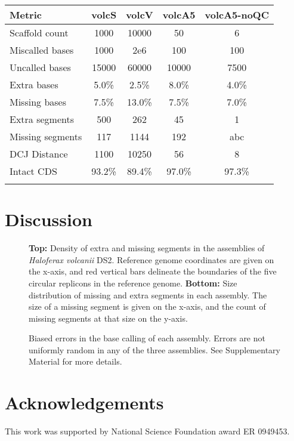 \documentclass{bioinfo}
\begin{document}
\begin{table}[!t]
{\begin{tabular}{l|cccc}\toprule
Metric & volcS & volcV & volcA5 & volcA5-noQC\\\midrule
Scaffold count & 1000 & 10000 & 50  & 6 \\
Miscalled bases & 1000 & 2e6 & 100 & 100 \\
Uncalled bases & 15000 & 60000 & 10000 & 7500 \\
Extra bases & 5.0\% & 2.5\% & 8.0\% & 4.0\% \\
Missing bases & 7.5\% & 13.0\% & 7.5\% & 7.0\% \\
Extra segments & 500 & 262 & 45 & 1 \\
Missing segments & 117 & 1144 & 192 & abc \\
DCJ Distance & 1100 & 10250 & 56 & 8 \\
Intact CDS & 93.2\% & 89.4\% & 97.0\% & 97.3\% \\
\botrule \\
\end{tabular}}{}
\end{table}



\section{Discussion}



\begin{figure}[t]
\vspace{-1cm}
\caption{\textbf{Top:} Density of extra and missing segments in the assemblies of \textit{Haloferax volcanii} DS2.
Reference genome coordinates are given on the x-axis, and red vertical bars delineate the boundaries of the
five circular replicons in the reference genome. \textbf{Bottom:} Size distribution of missing and extra segments in each assembly.  The size of a missing segment is given on the x-axis, and the count of missing segments at that size on the y-axis.}\label{fig:01}
\end{figure}

\begin{figure}[t]
\vspace{-1cm}
\caption{Biased errors in the base calling of each assembly. Errors are not uniformly random in any of the three assemblies. See Supplementary Material for more details.}\label{fig:02}
\end{figure}



\section*{Acknowledgements}
This work was supported by National Science Foundation award ER 0949453.



\end{document}
